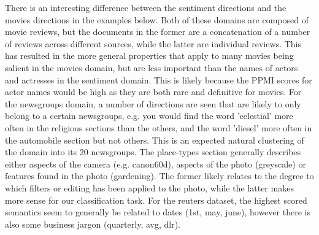 There is an  interesting difference between the sentiment directions and the movies directions in the examples below. Both of these domains are composed of movie reviews, but the documents in the former are a concatenation of a number of reviews across different sources, while the latter are individual reviews. This has resulted in the more general properties that apply to many movies being salient in the movies domain, but are less important than the names of actors and actresses in the sentiment domain. This is likely because the PPMI scores for actor names would be high as they are both rare and definitive for movies. For the newsgroups domain, a number of directions  are seen that are likely to only belong to a certain newsgroups, e.g. you would find the word 'celestial' more often in the religious sections than the others, and the word 'diesel' more often in the automobile section but not others. This is an expected natural clustering of the domain into its 20 newsgroups. The place-types section generally describes either aspects of the camera (e.g. canon60d), aspects of the photo (greyscale) or features found in the photo (gardening). The former likely relates to the degree to which filters or editing has been applied to the photo, while the latter makes more sense for our classification task. For the reuters dataset, the highest scored semantics seem to generally be related to dates (1st, may, june), however there is also some business jargon (quarterly, avg, dlr). 

